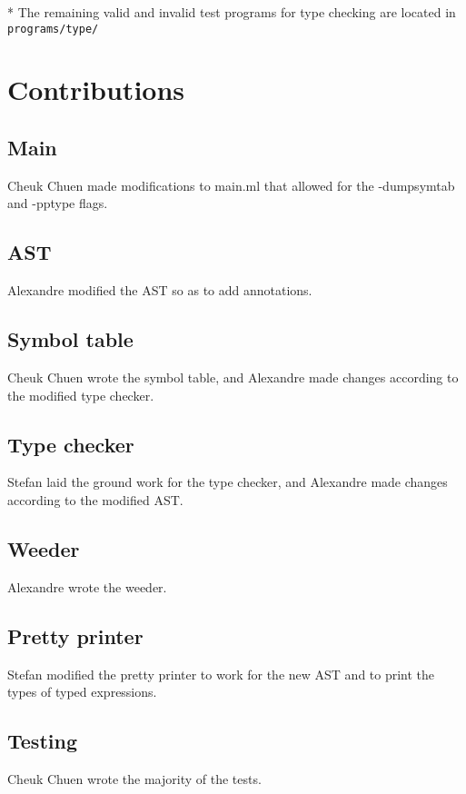 \documentclass{article}
\begin{document}
* The remaining valid and invalid test programs for type checking are located in \verb|programs/type/|
\hfill

\section*{Contributions}
\subsection*{Main}
Cheuk Chuen made modifications to main.ml that allowed for the -dumpsymtab and -pptype flags.

\subsection*{AST}
Alexandre modified the AST so as to add annotations.

\subsection*{Symbol table}
Cheuk Chuen wrote the symbol table, and Alexandre made changes according to the modified type checker.

\subsection*{Type checker}
Stefan laid the ground work for the type checker, and Alexandre made changes according to the modified AST.

\subsection*{Weeder}
Alexandre wrote the weeder.

\subsection*{Pretty printer}
Stefan modified the pretty printer to work for the new AST and to print the types of typed expressions.

\subsection*{Testing}
Cheuk Chuen wrote the majority of the tests.
\end{document}
